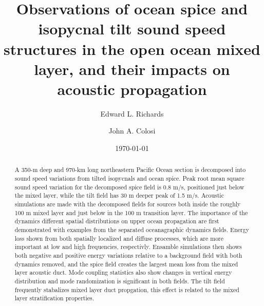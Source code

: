 \documentclass[preprint,NumberedRefs]{JASA}
\begin{document}
\title[Mixed layer tilt and spice]{Observations of ocean spice and isopycnal tilt sound speed structures in the open ocean mixed layer, and their impacts on acoustic propagation}
\author{Edward L. Richards}
\author{John A. Colosi}

\date{\today}

\begin{abstract}
    A 350-m deep and 970-km long northeastern Pacific Ocean section is decomposed into sound speed variations from tilted isopycnals and ocean spice. Peak root mean square sound speed variation for the decomposed spice field is 0.8 m/s, positioned just below the mixed layer, while the tilt field has 30 m deeper peak of 1.5 m/s. Acoustic simulations are made with the decomposed fields for sources both inside the roughly 100 m mixed layer and just below in the 100 m transition layer. The importance of the dynamics different spatial distributions on upper ocean propagation are first demonstrated with examples from the separated oceanagraphic dynamics fields. Energy loss shown from both spatially localized and diffuse processes, which are more important at low and high frequencies, respectivly. Ensamble simulations then shows both negative and positive energy variations relative to a background field with both dynamics removed, and the spice field creates the largest mean loss from the mixed layer acoustic duct. Mode coupling statistics also show changes in vertical energy distribution and mode randomization is significant in both fields. The tilt field frequently stabalizes mixed layer duct propgation, this effect is related to the mixed layer stratification properties.
\end{abstract}

\maketitle
\end{document}
